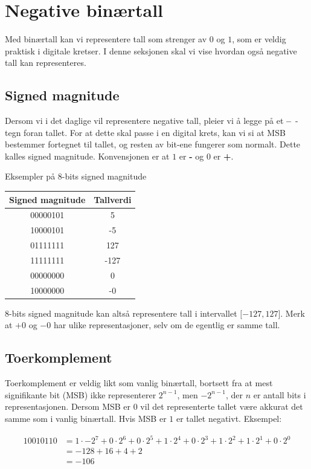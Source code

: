 \documentclass[12pt,a4paper,norsk]{article}
\begin{document}
\section{Negative binærtall}
Med binærtall kan vi representere tall som strenger av $0$ og $1$, som er veldig
praktisk i digitale kretser. I denne seksjonen skal vi vise hvordan også
negative tall kan representeres.

\subsection{Signed magnitude}
Dersom vi i det daglige vil representere negative tall, pleier vi å legge på et
\textbf{--}~-tegn foran tallet. For at dette skal passe i en digital krets, kan vi
si at MSB bestemmer fortegnet til tallet, og resten av bit-ene fungerer som
normalt. Dette kalles signed magnitude. Konvensjonen er at $1$ er \textbf{-} og
$0$ er \textbf{+}.
\begin{center}
  Eksempler på 8-bits signed magnitude\\[5mm]
  \begin{tabular}{c|c}
    \toprule
    Signed magnitude & Tallverdi \\
    \midrule
    00000101 & 5 \\
    10000101 & -5 \\
    01111111 & 127 \\
    11111111 & -127 \\
    00000000 & 0 \\
    10000000 & -0 \\
    \bottomrule
  \end{tabular}
\end{center}

8-bits signed magnitude kan altså representere tall i intervallet $\lbrack-127, 127\rbrack$.
Merk at $+0$ og $-0$ har ulike representasjoner, selv om de egentlig er samme tall.

\subsection{Toerkomplement}
Toerkomplement er veldig likt som vanlig binærtall, bortsett fra at mest
signifikante bit (MSB) ikke representerer $2^{n-1}$, men $-2^{n-1}$, der $n$ er
antall bits i representasjonen. Dersom MSB er $0$ vil det representerte tallet være
akkurat det samme som i vanlig binærtall. Hvis MSB er $1$ er tallet negativt.
Eksempel: 

\begin{align*}
  10010110 &= 1 \cdot -2^7 + 0 \cdot 2^6 + 0 \cdot 2^5 + 1 \cdot 2^4 + 0 \cdot 2^3 + 1 \cdot 2^2 + 1 \cdot 2^1 + 0 \cdot 2^0 \\
             &= -128 + 16 + 4 + 2 \\
             &= -106
\end{align*}
\end{document}
